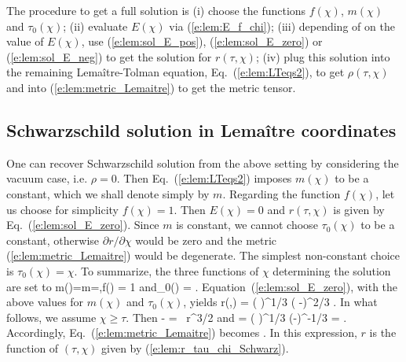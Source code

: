 The procedure to get a full solution is (i) choose the functions
$f(\chi)$, $m(\chi)$ and $\tau_0(\chi)$;
(ii) evaluate $E(\chi)$ via (\ref{e:lem:E_f_chi}); (iii) depending of
on the value of $E(\chi)$, use (\ref{e:lem:sol_E_pos}), (\ref{e:lem:sol_E_zero})
or (\ref{e:lem:sol_E_neg}) to get the solution for $r(\tau,\chi)$;
(iv) plug this solution into the remaining Lemaître-Tolman equation,
Eq.~(\ref{e:lem:LTeqs2}), to get $\rho(\tau,\chi)$ and into
(\ref{e:lem:metric_Lemaitre}) to get the metric tensor.

\subsection{Schwarzschild solution in Lemaître coordinates}

One can recover Schwarzschild solution from the above setting by
considering the vacuum case, i.e. $\rho=0$. Then
Eq.~(\ref{e:lem:LTeqs2}) imposes $m(\chi)$ to be a constant, which
we shall denote simply by $m$. Regarding the function $f(\chi)$, let us
choose for simplicity $f(\chi)=1$. Then $E(\chi)=0$ and $r(\tau,\chi)$
is given by Eq.~(\ref{e:lem:sol_E_zero}). Since $m$ is constant, we
cannot choose $\tau_0(\chi)$ to be a constant, otherwise
$\partial r/\partial \chi$ would be zero and the metric
(\ref{e:lem:metric_Lemaitre}) would be degenerate.
The simplest non-constant choice is
$\tau_0(\chi) = \chi$. To summarize, the
three functions of $\chi$ determining the solution are set to
\be
    m(\chi)=m=,\qquad f(\chi) = 1 \qquad\mbox{and}\qquad \tau_0(\chi) = \chi .
\ee
Equation~(\ref{e:lem:sol_E_zero}), with the above values for $m(\chi)$ and $\tau_0(\chi)$,
yields
\be \label{e:lem:r_tau_chi_Schwarz}
    r(\tau,\chi) =  \left(  \right)^{1/3} ( \chi -\tau )^{2/3} .
\ee
In what follows, we assume $\chi\geq\tau$. Then
\be \label{e:lem:chi_tau_r_Schwarz}
    \chi - \tau =  \,  r^{3/2}
\ee
and
\be \label{e:lem:drdchi_Schwarz}
     = \left(  \right)^{1/3} (\chi-\tau)^{-1/3}
        =  .
\ee
Accordingly, Eq.~(\ref{e:lem:metric_Lemaitre}) becomes
\be \label{e:lem:Sch_met_Lem}
     .
\ee
In this expression, $r$ is the function of $(\tau,\chi)$ given
by (\ref{e:lem:r_tau_chi_Schwarz}).

